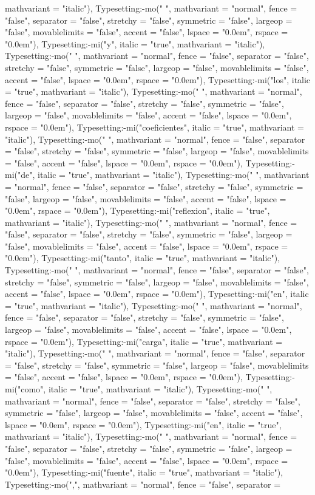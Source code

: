 \documentclass{article}
\begin{document}
\begin{Maple Normal}
{\begin{Maple Normal}
{mathvariant = "italic"), Typesetting:-mo(" ", mathvariant = "normal", fence = "false", separator = "false", stretchy = "false", symmetric = "false", largeop = "false", movablelimits = "false", accent = "false", lspace = "0.0em", rspace = "0.0em"), Typesetting:-mi("y", italic = "true", mathvariant = "italic"), Typesetting:-mo(" ", mathvariant = "normal", fence = "false", separator = "false", stretchy = "false", symmetric = "false", largeop = "false", movablelimits = "false", accent = "false", lspace = "0.0em", rspace = "0.0em"), Typesetting:-mi("los", italic = "true", mathvariant = "italic"), Typesetting:-mo(" ", mathvariant = "normal", fence = "false", separator = "false", stretchy = "false", symmetric = "false", largeop = "false", movablelimits = "false", accent = "false", lspace = "0.0em", rspace = "0.0em"), Typesetting:-mi("coeficientes", italic = "true", mathvariant = "italic"), Typesetting:-mo(" ", mathvariant = "normal", fence = "false", separator = "false", stretchy = "false", symmetric = "false", largeop = "false", movablelimits = "false", accent = "false", lspace = "0.0em", rspace = "0.0em"), Typesetting:-mi("de", italic = "true", mathvariant = "italic"), Typesetting:-mo(" ", mathvariant = "normal", fence = "false", separator = "false", stretchy = "false", symmetric = "false", largeop = "false", movablelimits = "false", accent = "false", lspace = "0.0em", rspace = "0.0em"), Typesetting:-mi("reflexion", italic = "true", mathvariant = "italic"), Typesetting:-mo(" ", mathvariant = "normal", fence = "false", separator = "false", stretchy = "false", symmetric = "false", largeop = "false", movablelimits = "false", accent = "false", lspace = "0.0em", rspace = "0.0em"), Typesetting:-mi("tanto", italic = "true", mathvariant = "italic"), Typesetting:-mo(" ", mathvariant = "normal", fence = "false", separator = "false", stretchy = "false", symmetric = "false", largeop = "false", movablelimits = "false", accent = "false", lspace = "0.0em", rspace = "0.0em"), Typesetting:-mi("en", italic = "true", mathvariant = "italic"), Typesetting:-mo(" ", mathvariant = "normal", fence = "false", separator = "false", stretchy = "false", symmetric = "false", largeop = "false", movablelimits = "false", accent = "false", lspace = "0.0em", rspace = "0.0em"), Typesetting:-mi("carga", italic = "true", mathvariant = "italic"), Typesetting:-mo(" ", mathvariant = "normal", fence = "false", separator = "false", stretchy = "false", symmetric = "false", largeop = "false", movablelimits = "false", accent = "false", lspace = "0.0em", rspace = "0.0em"), Typesetting:-mi("como", italic = "true", mathvariant = "italic"), Typesetting:-mo(" ", mathvariant = "normal", fence = "false", separator = "false", stretchy = "false", symmetric = "false", largeop = "false", movablelimits = "false", accent = "false", lspace = "0.0em", rspace = "0.0em"), Typesetting:-mi("en", italic = "true", mathvariant = "italic"), Typesetting:-mo(" ", mathvariant = "normal", fence = "false", separator = "false", stretchy = "false", symmetric = "false", largeop = "false", movablelimits = "false", accent = "false", lspace = "0.0em", rspace = "0.0em"), Typesetting:-mi("fuente", italic = "true", mathvariant = "italic"), Typesetting:-mo(",", mathvariant = "normal", fence = "false", separator = }
\end{Maple Normal}}
\end{Maple Normal}
\end{document}
